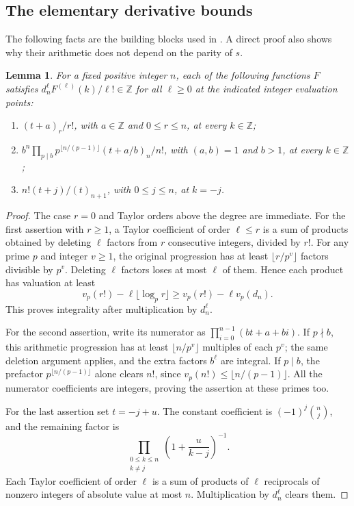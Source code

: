\documentclass[11pt]{article}
\newtheorem{lemma}[theorem]{Lemma}
\theoremstyle{remark}
\newcommand{\Z}{\mathbb Z}
\numberwithin{equation}{section}
\begin{document}
\subsection{The elementary derivative bounds}
The following facts are the building blocks used in
\cite[Section~3]{FLSZ}. A direct proof also shows why their arithmetic
does not depend on the parity of $s$.

\begin{lemma}\label{lem:blocks}
For a fixed positive integer $n$, each of the following functions $F$
satisfies $d_n^\ell F^{(\ell)}(k)/\ell!\in\Z$ for all $\ell\geq0$
at the indicated integer evaluation points:
\begin{enumerate}
\item $(t+a)_r/r!$, with $a\in\Z$ and $0\leq r\leq n$, at every $k\in\Z$;
\item $b^n\prod_{p\mid b}p^{\lfloor n/(p-1)\rfloor}(t+a/b)_n/n!$,
      with $(a,b)=1$ and $b>1$, at every $k\in\Z$;
\item $n!(t+j)/(t)_{n+1}$, with $0\leq j\leq n$, at $k=-j$.
\end{enumerate}
\end{lemma}
\begin{proof}
The case $r=0$ and Taylor orders above the degree are immediate.
For the first assertion with $r\geq1$, a Taylor coefficient of order $\ell\leq r$
is a sum of products obtained by deleting $\ell$ factors from $r$
consecutive integers, divided by $r!$. For any prime $p$ and integer
$v\geq1$, the original progression has at least $\lfloor r/p^v\rfloor$
factors divisible by $p^v$. Deleting $\ell$ factors loses at most $\ell$
of them. Hence each product has valuation at least
\[
 v_p(r!)-\ell\lfloor\log_p r\rfloor
 \geq v_p(r!)-\ell v_p(d_n).
\]
This proves integrality after multiplication by $d_n^\ell$.

For the second assertion, write its numerator as
$\prod_{i=0}^{n-1}(bt+a+bi)$. If $p\nmid b$, this arithmetic progression
has at least $\lfloor n/p^v\rfloor$ multiples of each $p^v$; the same
deletion argument applies, and the extra factors $b^\ell$ are integral.
If $p\mid b$, the prefactor $p^{\lfloor n/(p-1)\rfloor}$ alone clears
$n!$, since $v_p(n!)\leq\lfloor n/(p-1)\rfloor$. All the numerator
coefficients are integers, proving the assertion at these primes too.

For the last assertion set $t=-j+u$. The constant coefficient is
$(-1)^j\binom nj$, and the remaining factor is
\[
 \prod_{\substack{0\leq k\leq n\\k\ne j}}
     \left(1+\frac{u}{k-j}\right)^{-1}.
\]
Each Taylor coefficient of order $\ell$ is a sum of products of $\ell$
reciprocals of nonzero integers of absolute value at most $n$.
Multiplication by $d_n^\ell$ clears them.
\end{proof}
\end{document}
